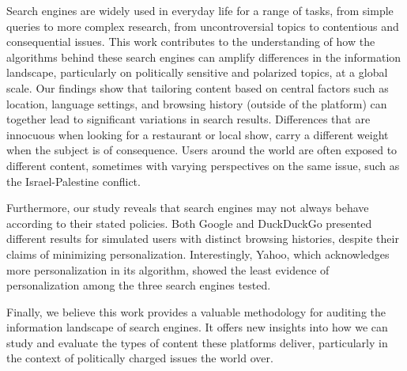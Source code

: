 Search engines are widely used in everyday life for a range of tasks, from simple queries to more complex research, from uncontroversial topics to contentious and consequential issues. This work contributes to the understanding of how the algorithms behind these search engines can amplify differences in the information landscape, particularly on politically sensitive and polarized topics, at a global scale. Our findings show that tailoring content based on central factors such as location, language settings, and browsing history (outside of the platform) can together lead to significant variations in search results. Differences that are innocuous when looking for a restaurant or local show, carry a different weight when the subject is of consequence. Users around the world are often exposed to different content, sometimes with varying perspectives on the same issue, such as the Israel-Palestine conflict.

Furthermore, our study reveals that search engines may not always behave according to their stated policies. Both Google and DuckDuckGo presented different results for simulated users with distinct browsing histories, despite their claims of minimizing personalization. Interestingly, Yahoo, which acknowledges more personalization in its algorithm, showed the least evidence of personalization among the three search engines tested.

Finally, we believe this work provides a valuable methodology for auditing the information landscape of search engines. It offers new insights into how we can study and evaluate the types of content these platforms deliver, particularly in the context of politically charged issues the world over.